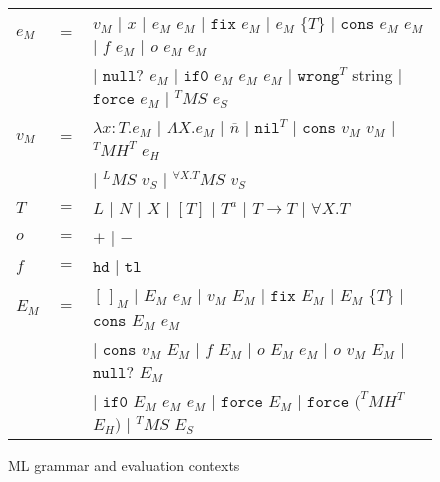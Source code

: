 \begin{figure}[p]
\centering
\begin{tabular}{lcl}
\vspace{5pt}

$e_{M}$ & $=$ & $v_{M}$ $\vert$ $x$ $\vert$ $e_{M}$ $e_{M}$ $\vert$ $\mathtt{fix}$ $e_{M}$ $\vert$ $e_{M}$ $\lbrace T\rbrace$ $\vert$ $\mathtt{cons}$ $e_{M}$ $e_{M}$ $\vert$ $f$ $e_{M}$ $\vert$ $o$ $e_{M}$ $e_{M}$ \\

\vspace{5pt}

&& $\vert$ $\mathtt{null?}$ $e_{M}$ $\vert$ $\mathtt{if0}$ $e_{M}$ $e_{M}$ $e_{M}$ $\vert$ $\mathtt{wrong}^{T}$ string $\vert$ $\mathtt{force}$ $e_{M}$ $\vert$ $^{T}MS$ $e_{S}$ \\

\vspace{5pt}

$v_{M}$ & $=$ & $\lambda x:T.e_{M}$ $\vert$ $\Lambda X.e_{M}$ $\vert$ $\overline{n}$ $\vert$ $\mathtt{nil}^{T}$ $\vert$ $\mathtt{cons}$ $v_{M}$ $v_{M}$ $\vert$ $^{T}MH^{T}$ $e_{H}$ \\

\vspace{5pt}

&& $\vert$ $^{L}MS$ $v_{S}$ $\vert$ $^{\forall X.T}MS$ $v_{S}$ \\

\vspace{5pt}

$T$ & $=$ & $L$ $\vert$ $N$ $\vert$ $X$ $\vert$ $[T]$ $\vert$ $T^{a}$ $\vert$ $T\rightarrow T$ $\vert$ $\forall X.T$ \\

\vspace{5pt}

$o$ & $=$ & $+$ $\vert$ $-$ \\

\vspace{5pt}

$f$ & $=$ & $\mathtt{hd}$ $\vert$ $\mathtt{tl}$ \\

\vspace{5pt}

$E_{M}$ & $=$ & $[\,]_{M}$ $\vert$ $E_{M}$ $e_{M}$ $\vert$ $v_{M}$ $E_{M}$ $\vert$ $\mathtt{fix}$ $E_{M}$ $\vert$ $E_{M}$ $\lbrace T\rbrace$ $\vert$ $\mathtt{cons}$ $E_{M}$ $e_{M}$ \\

\vspace{5pt}

&& $\vert$ $\mathtt{cons}$ $v_{M}$ $E_{M}$ $\vert$ $f$ $E_{M}$ $\vert$ $o$ $E_{M}$ $e_{M}$ $\vert$ $o$ $v_{M}$ $E_{M}$ $\vert$ $\mathtt{null?}$ $E_{M}$ \\

\vspace{5pt}

&& $\vert$ $\mathtt{if0}$ $E_{M}$ $e_{M}$ $e_{M}$ $\vert$ $\mathtt{force}$ $E_{M}$ $\vert$ $\mathtt{force}$ $(^{T}MH^{T}$ $E_{H})$ $\vert$ $^{T}MS$ $E_{S}$
\end{tabular}
\caption{ML grammar and evaluation contexts}
\label{mg}
\end{figure}